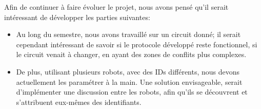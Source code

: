 \documentclass[french,a4paper,12pt]{report}
\begin{document}
Afin de continuer à faire évoluer le projet, nous avons pensé qu'il serait intéressant de développer les parties suivantes:
\begin{itemize}
\item Au long du semestre, nous avons travaillé sur un circuit donné; il serait cependant intéressant de savoir si le protocole développé reste fonctionnel, si le circuit venait à changer, en ayant des zones de conflits plus complexes.

\item De plus, utilisant plusieurs robots, avec des IDs différents, nous devons actuellement les paramétrer à la main. Une solution envisageable, serait d'implémenter une discussion entre les robots, afin qu'ils se découvrent et s'attribuent eux-mêmes des identifiants.
\end{itemize}
\end{document}
